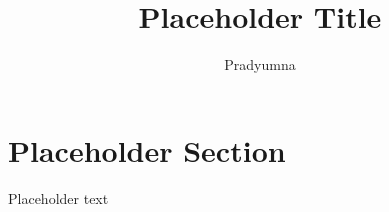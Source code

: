 \documentclass{article}
\author{Pradyumna}
\title{Placeholder Title}
\begin{document}
\maketitle
	\section*{Placeholder Section}
		Placeholder text
\end{document}
